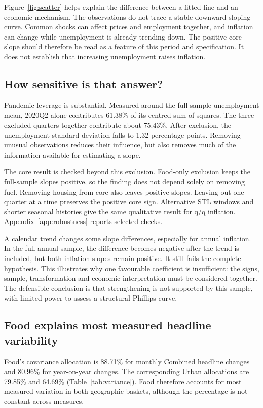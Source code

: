 \documentclass[11pt,a4paper]{article}
\begin{document}
Figure~\ref{fig:scatter} helps explain the difference between a fitted line and an economic mechanism. The observations do not trace a stable downward-sloping curve. Common shocks can affect prices and employment together, and inflation can change while unemployment is already trending down. The positive core slope should therefore be read as a feature of this period and specification. It does not establish that increasing unemployment raises inflation.

\subsection{How sensitive is that answer?}

Pandemic leverage is substantial. Measured around the full-sample unemployment mean, 2020Q2 alone contributes 61.38\% of its centred sum of squares. The three excluded quarters together contribute about 75.43\%. After exclusion, the unemployment standard deviation falls to 1.32 percentage points. Removing unusual observations reduces their influence, but also removes much of the information available for estimating a slope.

The core result is checked beyond this exclusion. Food-only exclusion keeps the full-sample slopes positive, so the finding does not depend solely on removing fuel. Removing housing from core also leaves positive slopes. Leaving out one quarter at a time preserves the positive core sign. Alternative STL windows and shorter seasonal histories give the same qualitative result for q/q inflation. Appendix~\ref{app:robustness} reports selected checks.

A calendar trend changes some slope differences, especially for annual inflation. In the full annual sample, the difference becomes negative after the trend is included, but both inflation slopes remain positive. It still fails the complete hypothesis. This illustrates why one favourable coefficient is insufficient: the signs, sample, transformation and economic interpretation must be considered together. The defensible conclusion is that strengthening is not supported by this sample, with limited power to assess a structural Phillips curve.

\subsection{Food explains most measured headline variability}

Food's covariance allocation is 88.71\% for monthly Combined headline changes and 80.96\% for year-on-year changes. The corresponding Urban allocations are 79.85\% and 64.69\% (Table~\ref{tab:variance}). Food therefore accounts for most measured variation in both geographic baskets, although the percentage is not constant across measures.
\end{document}
